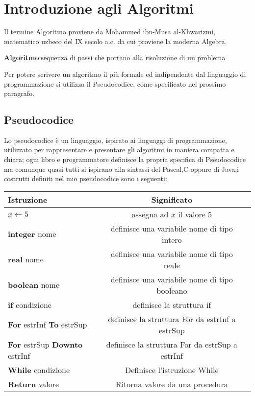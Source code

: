 \chapter{Introduzione agli Algoritmi}
Il termine Algoritmo proviene da Mohammed ibn-Musa al-Khwarizmi, matematico uzbeco
del IX secolo a.c. da cui proviene la moderna Algebra.%

\textbf{Algoritmo}:sequenza di passi che portano alla risoluzione di un problema

Per potere scrivere un algoritmo il più formale ed indipendente dal linguaggio di programmazione
si utilizza il Pseudocodice, come specificato nel prossimo paragrafo.

\section{Pseudocodice}
Lo pseudocodice è un linguaggio, ispirato ai linguaggi di programmazione, utilizzato
per rappresentare e presentare gli algoritmi in maniera compatta e chiara;
ogni libro e programmatore definisce la propria specifica di Pseudocodice ma comunque
quasi tutti si ispirano alla sintassi del Pascal,C oppure di Java;i costrutti definiti
nel mio pseudocodice sono i seguenti:

\begin{tabular}{lcr}
  \toprule Istruzione & Significato\\
  \midrule
  $x \gets 5$ & assegna ad $x$ il valore $5$\\
  \textbf{integer} nome & definisce una variabile nome di tipo intero\\
  \textbf{real} nome & definisce una variabile nome di tipo reale\\
  \textbf{boolean} nome & definisce una variabile nome di tipo booleano\\
  \textbf{if} condizione & definisce la struttura if\\
  \textbf{For} estrInf \textbf{To} estrSup & definisce la struttura For da estrInf a estrSup \\
  \textbf{For} estrSup \textbf{Downto} estrInf & definisce la struttura For da estrSup a estrInf\\
  \textbf{While} condizione & Definisce l'istruzione While\\
  \textbf{Return} valore & Ritorna valore da una procedura\\
  \bottomrule
\end{tabular}

